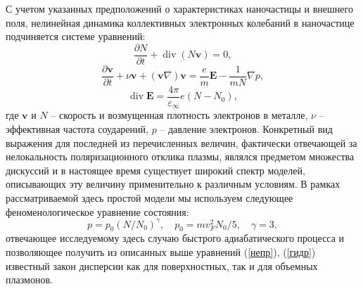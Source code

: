 \documentclass[12pt, a4paper]{article}
\renewcommand{\vec}{\mathbf}
\def \eps {\varepsilon}
\newcommand{\dt}[1]{\frac{\partial {#1}}{\partial t}}
\begin{document}
С учетом указанных предположений о характеристиках наночастицы и внешнего поля, нелинейная динамика коллективных электронных колебаний в наночастице подчиняется системе уравнений:
\begin{equation} 
	\label{непр}
	\dt{N} + \operatorname{div}(N \vec{v}) = 0,
\end{equation}
\begin{equation} 
	\label{гидр}
	\dt{\vec{v}} + \nu \vec{v} +(\vec{v} \nabla)\vec{v} = \frac{e}{m}\vec{E} - \frac{1}{mN} \nabla p, 
\end{equation}
\begin{equation} 
	\label{максв}
	\operatorname{div}\vec{E} = \frac{4\pi}{\eps_\infty}e(N-N_0),
\end{equation}
где $\vec{v}$ и $N$ – скорость и возмущенная плотность электронов в металле, $\nu$ – эффективная частота соударений, 
$p$ – давление электронов. Конкретный вид выражения для последней из перечисленных величин, фактически отвечающей за нелокальность поляризационного отклика плазмы, являлся предметом множества дискуссий и в настоящее время существует широкий спектр моделей, описывающих эту величину применительно к различным условиям. В рамках рассматриваемой здесь простой модели мы используем следующее феноменологическое уравнение состояния:
\begin{equation}
	\label{p}
	p = p_0 (N/N_0)^\gamma, \quad p_0 = m v_F^2 N_0/5, \quad \gamma = 3,
\end{equation}
отвечающее исследуемому здесь случаю быстрого адиабатического процесса и позволяющее получить из описанных выше уравнений (\ref{непр}), (\ref{гидр}) известный закон дисперсии как для поверхностных, так и для объемных плазмонов.
\end{document}
